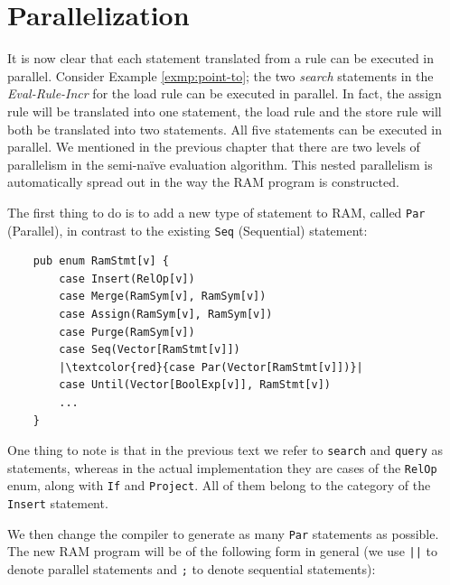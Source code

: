 \documentclass[11pt]{report}
\theoremstyle{definition}
\begin{document}
\section{Parallelization}

It is now clear that each statement translated from a rule can be executed in parallel. Consider Example \ref{exmp:point-to}; the two \textit{search} statements in the \textit{Eval-Rule-Incr} for the load rule can be executed in parallel. In fact, the assign rule will be translated into one statement, the load rule and the store rule will both be translated into two statements. All five statements can be executed in parallel. We mentioned in the previous chapter that there are two levels of parallelism in the semi-naïve evaluation algorithm. This nested parallelism is automatically spread out in the way the RAM program is constructed.

The first thing to do is to add a new type of statement to RAM, called \texttt{Par} (Parallel), in contrast to the existing \texttt{Seq} (Sequential) statement:

\begin{verbatim}
    pub enum RamStmt[v] {
        case Insert(RelOp[v])
        case Merge(RamSym[v], RamSym[v])
        case Assign(RamSym[v], RamSym[v])
        case Purge(RamSym[v])
        case Seq(Vector[RamStmt[v]])
        |\textcolor{red}{case Par(Vector[RamStmt[v]])}|
        case Until(Vector[BoolExp[v]], RamStmt[v])
        ...
    }
\end{verbatim}

One thing to note is that in the previous text we refer to \texttt{search} and \texttt{query} as statements, whereas in the actual implementation they are cases of the \texttt{RelOp} enum, along with \texttt{If} and \texttt{Project}. All of them belong to the category of the \texttt{Insert} statement.

We then change the compiler to generate as many \texttt{Par} statements as possible. The new RAM program will be of the following form in general (we use \texttt{||} to denote parallel statements and \texttt{;} to denote sequential statements):
\end{document}
